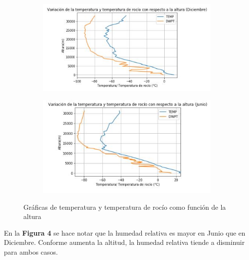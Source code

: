 \documentclass[a4paper]{article}
\begin{document}
\begin{figure}[ht!]
\centering
\begin{subfigure}{0.49\textwidth}
\centering
\includegraphics[width = \textwidth]{Temp_rocio_altura_dec.JPG}

\end{subfigure}
\begin{subfigure}{0.49\textwidth}
\centering
\includegraphics[width = \textwidth]{Temp_rocio_altura_jun.JPG}

\end{subfigure}
\caption{Gráficas de temperatura y temperatura de rocío como función de la altura}
\label{fig:combined}
\end{figure}


En la \textbf{Figura 4} se hace notar que la humedad relativa es mayor en Junio que en Diciembre. Conforme aumenta la altitud, la humedad relativa tiende a disminuir para ambos casos. 
\end{document}
